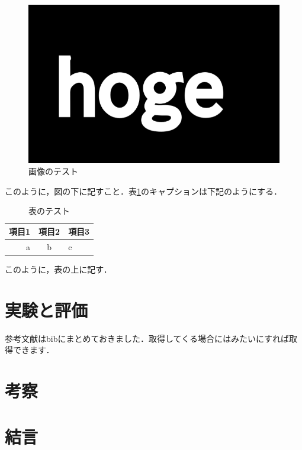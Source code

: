 \documentclass[11pt, a4paper]{jarticle}
\begin{document}
\begin{figure}[H]%
  \includegraphics[scale=0.5]{hoge.png}
  \caption{画像のテスト}
  \label{fig1}%
\end{figure}

このように，図の下に記すこと．表\ref{tab1}のキャプションは下記のようにする．

\begin{table}[H]
  \caption{表のテスト}
  \begin{center}
  \begin{tabular}{ r  c  p{} } %
    \hline
    項目1 & 項目2 & 項目3 \\
    \hline
    a & b & c \\
    \hline
  \end{tabular}%
  \end{center}
  \label{tab1}
\end{table}

このように，表の上に記す．

\section{実験と評価}
参考文献はbibにまとめておきました．取得してくる場合には\cite{marumaru}\cite{abc}\cite{batubatu}\cite{efghij}みたいにすれば取得できます．

\section{考察}

\section{結言}

\end{document}
